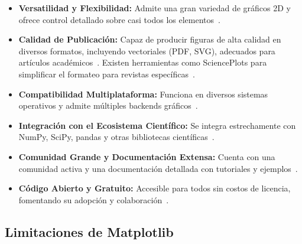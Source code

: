 \begin{itemize}
    \item \textbf{Versatilidad y Flexibilidad:} Admite una gran variedad de gráficos 2D y ofrece control detallado sobre casi todos los elementos~\cite{GeeksforGeeksIntroMPL, Vu2023}.
    \item \textbf{Calidad de Publicación:} Capaz de producir figuras de alta calidad en diversos formatos, incluyendo vectoriales (PDF, SVG), adecuados para artículos académicos~\cite{Hunter2007, Zhauniarovich2022}. Existen herramientas como SciencePlots para simplificar el formateo para revistas específicas~\cite{GarrettSciencePlots}.
    \item \textbf{Compatibilidad Multiplataforma:} Funciona en diversos sistemas operativos y admite múltiples backends gráficos~\cite{Jones2012Matplotlib}.
    \item \textbf{Integración con el Ecosistema Científico:} Se integra estrechamente con NumPy, SciPy, pandas y otras bibliotecas científicas~\cite{VanderPlas2016, SciPyLecturesEcosystem}.
    \item \textbf{Comunidad Grande y Documentación Extensa:} Cuenta con una comunidad activa y una documentación detallada con tutoriales y ejemplos~\cite{MatplotlibDevTeamMain, MatplotlibDevTeamQuickStart}.
    \item \textbf{Código Abierto y Gratuito:} Accesible para todos sin costos de licencia, fomentando su adopción y colaboración~\cite{ActiveStateMatplotlib}.
\end{itemize}

\subsection{Limitaciones de Matplotlib}%
\label{subsec:limitaciones}

